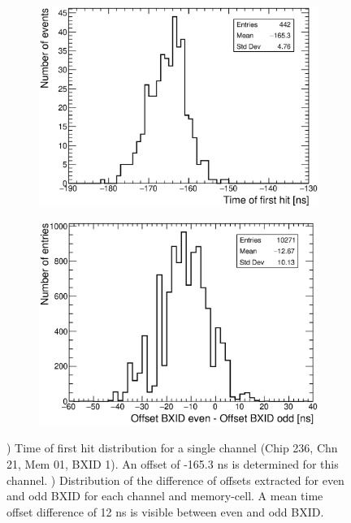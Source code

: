 \begin{figure}[htbp!]
	\begin{subfigure}[t]{0.49\textwidth}
		\centering
		\includegraphics[width=1\textwidth]{../Thesis_Plots/Timing/Muons/Plots/Timing_Chip236_Chn21_Mem01_BXID1_withOffset.eps}
		\caption{}\label{fig:TimeChnwithOffset}
	\end{subfigure}
	\hfill
	\begin{subfigure}[t]{0.49\textwidth}
		\centering
		\includegraphics[width=1\textwidth]{../Thesis_Plots/Timing/Muons/Plots/BXIDDifferenceOffsets.eps}
		\caption{}\label{fig:BXID_offset}
	\end{subfigure}
	\caption{) Time of first hit distribution for a single channel (Chip 236, Chn 21, Mem 01, BXID 1). An offset of -165.3 ns is determined for this channel. ) Distribution of the difference of offsets extracted for even and odd BXID for each channel and memory-cell. A mean time offset difference of 12 ns is visible between even and odd BXID.}
\end{figure}

